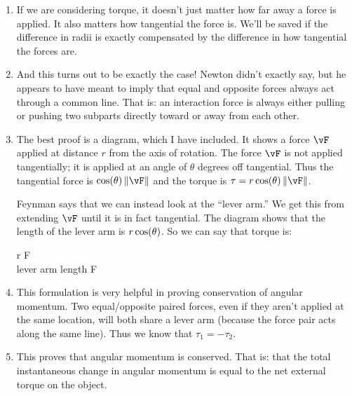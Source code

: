 \begin{enumerate}
  \item If we are considering torque, it doesn't just matter how far
  away a force is applied. It also matters how tangential the force is.
  We'll be saved if the difference in radii is exactly compensated by
  the difference in how tangential the forces are.

  \item And this turns out to be exactly the case! Newton didn't exactly
  say, but he appears to have meant to imply that equal and opposite
  forces always act through a common line. That is: an interaction force
  is always either pulling or pushing two subparts directly toward or
  away from each other.

  \item The best proof is a diagram, which I have included. It shows a
  force $\vF$ applied at distance $r$ from the axis of rotation. The
  force $\vF$ is not applied tangentially; it is applied at an angle of
  $\theta$ degrees off tangential. Thus the tangential force is
  $\cosf{\theta} \norm{\vF}$ and the torque is $\tau = r \cosf{\theta}
  \norm{\vF}$.

  Feynman says that we can instead look at the ``lever arm.'' We get
  this from extending $\vF$ until it is in fact tangential. The diagram
  shows that the length of the lever arm is $r \cos\mathopen{}\left( {\theta} \right)\mathclose{}$. So we can
  say that torque is:

  \begin{nedqn}
    \tau
  \eqcol
    r \cosf{\theta} F
  \\
  \eqcol
    \textrm{lever arm length} \cdot F
  \end{nedqn}

  \item This formulation is very helpful in proving conservation of
  angular momentum. Two equal/opposite paired forces, even if they
  aren't applied at the same location, will both share a lever arm
  (because the force pair acts along the same line). Thus we know that
  $\tau_1 = -\tau_2$.

  \item This proves that angular momentum is conserved. That is: that
  the total instantaneous change in angular momentum is equal to the net
  external torque on the object.
\end{enumerate}
